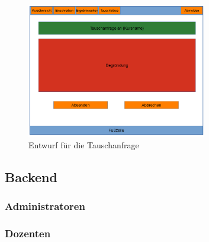             \begin{figure}[t]
                \centering
                \includegraphics[width=0.7\textwidth]{./design/images/MockUpsFrontend/frontendSwap2.png}
                \caption{Entwurf für die Tauschanfrage}
                \label{mockupResultsFrontend}
            \end{figure}
            
    
        \subsection{Backend}
        	\subsubsection{Administratoren}
        	\subsubsection{Dozenten}